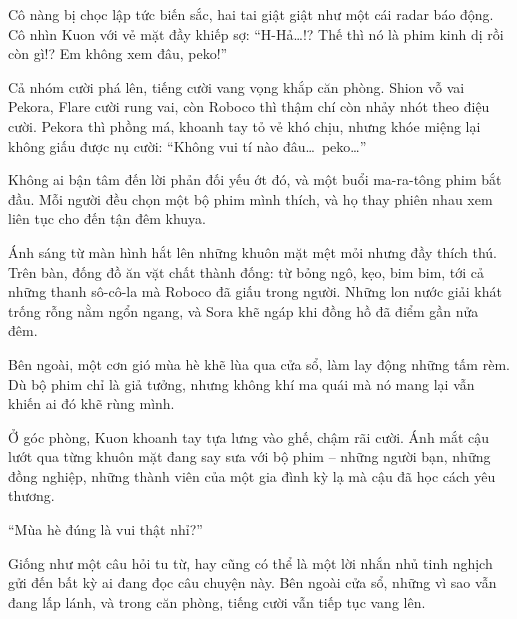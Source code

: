 \documentclass[../main.tex]{subfiles}
\begin{document}
Cô nàng bị chọc lập tức biến sắc, hai tai giật giật như một cái radar báo động. Cô nhìn Kuon với vẻ mặt đầy khiếp sợ: ``H-Hả\dots!? Thế thì nó là phim kinh dị rồi còn gì!? Em không xem đâu, peko!''

Cả nhóm cười phá lên, tiếng cười vang vọng khắp căn phòng. Shion vỗ vai Pekora, Flare cười rung vai, còn Roboco thì thậm chí còn nhảy nhót theo điệu cười. Pekora thì phồng má, khoanh tay tỏ vẻ khó chịu, nhưng khóe miệng lại không giấu được nụ cười: ``Không vui tí nào đâu\dots\ peko\dots''

Không ai bận tâm đến lời phản đối yếu ớt đó, và một buổi ma-ra-tông phim bắt đầu. Mỗi người đều chọn một bộ phim mình thích, và họ thay phiên nhau xem liên tục cho đến tận đêm khuya.

Ánh sáng từ màn hình hắt lên những khuôn mặt mệt mỏi nhưng đầy thích thú. Trên bàn, đống đồ ăn vặt chất thành đống: từ bỏng ngô, kẹo, bim bim, tới cả những thanh sô-cô-la mà Roboco đã giấu trong người. Những lon nước giải khát trống rỗng nằm ngổn ngang, và Sora khẽ ngáp khi đồng hồ đã điểm gần nửa đêm.

Bên ngoài, một cơn gió mùa hè khẽ lùa qua cửa sổ, làm lay động những tấm rèm. Dù bộ phim chỉ là giả tưởng, nhưng không khí ma quái mà nó mang lại vẫn khiến ai đó khẽ rùng mình.

Ở góc phòng, Kuon khoanh tay tựa lưng vào ghế, chậm rãi cười. Ánh mắt cậu lướt qua từng khuôn mặt đang say sưa với bộ phim – những người bạn, những đồng nghiệp, những thành viên của một gia đình kỳ lạ mà cậu đã học cách yêu thương.

``Mùa hè đúng là vui thật nhỉ?''

Giống như một câu hỏi tu từ, hay cũng có thể là một lời nhắn nhủ tinh nghịch gửi đến bất kỳ ai đang đọc câu chuyện này. Bên ngoài cửa sổ, những vì sao vẫn đang lấp lánh, và trong căn phòng, tiếng cười vẫn tiếp tục vang lên.
\end{document}
